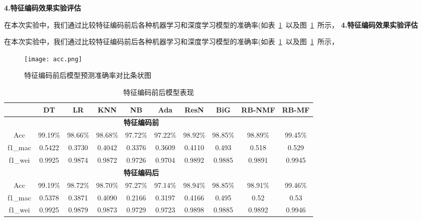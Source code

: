 \textbf{4.特征编码效果实验评估}\par
在本次实验中，我们通过比较特征编码前后各种机器学习和深度学习模型的准确率(如表~\ref{tab:model_performance}~以及图~\ref{fig:comapre_accuracy_encoding}~所示，
\textbf{4.特征编码效果实验评估}\par
在本次实验中，我们通过比较特征编码前后各种机器学习和深度学习模型的准确率(如表~\ref{tab:model_performance}~以及图~\ref{fig:comapre_accuracy_encoding}~所示，
\begin{figure}[htbp]
	\centering
	\texttt{[image: acc.png]}
	\caption{特征编码前后模型预测准确率对比条状图}
	\label{fig:comapre_accuracy_encoding}
\end{figure}
\begin{table}[htbp]
	\centering
	\setlength{\tabcolsep}{1pt}
	\caption{特征编码前后模型表现}
	\label{tab:model_performance}
	\begin{tabular}{cccccccccc}
		\toprule
		        & DT               & LR              & KNN             & NB             & Ada               & ResN            & BiG           & RB-NMF          & RB-MF           \\
		\midrule
		\multicolumn{9}{c}{\textbf{特征编码前}}                                                                                                                                   \\
		Acc     & 99.19\%          & 98.66\%         & 98.68\%         & 97.72\%        & 97.22\%           & 98.92\%         & 98.85\%       & 98.89\%         & 99.45\%         \\
		f1\_mac & 0.5422           & 0.3730          & 0.4042          & 0.3376         & 0.3609            & 0.4110          & 0.493         & 0.518           & 0.529           \\
		f1\_wei & 0.9925           & 0.9874          & 0.9872          & 0.9726         & 0.9704            & 0.9892          & 0.9885        & 0.9891          & 0.9945          \\
		\midrule
		\multicolumn{9}{c}{\textbf{特征编码后}}                                                                                                                                   \\
		Acc     & 99.19\%          & 98.72\%\uparrow & 98.70\%\uparrow & 97.27\%        & 97.14\%\downarrow & 98.94\%\uparrow & 98.85\%       & 98.91\%\uparrow & 99.46\%\uparrow \\
		f1\_mac & 0.5378\downarrow & 0.3871\uparrow  & 0.4090\uparrow  & 0.2166         & 0.3197\downarrow  & 0.4166\uparrow  & 0.495\uparrow & 0.52\uparrow    & 0.53\uparrow    \\
		f1\_wei & 0.9925           & 0.9879\uparrow  & 0.9873\uparrow  & 0.9729\uparrow & 0.9723\uparrow    & 0.9898\uparrow  & 0.9885        & 0.9892\uparrow  & 0.9946\uparrow  \\
		\bottomrule
	\end{tabular}
\end{table}
